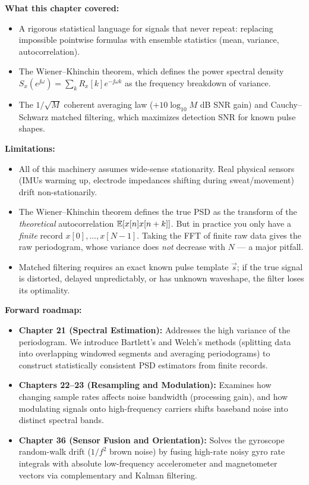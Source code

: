 \begin{recoverybox}
\textbf{What this chapter covered:}
\begin{itemize}
  \item A rigorous statistical language for signals that never repeat: replacing impossible pointwise formulas with ensemble statistics (mean, variance, autocorrelation).
  \item The Wiener--Khinchin theorem, which defines the power spectral density $S_x(e^{\jj\omega}) = \sum_k R_x[k]e^{-\jj\omega k}$ as the frequency breakdown of variance.
  \item The $1/\sqrt{M}$ coherent averaging law ($+10\log_{10}M$ dB SNR gain) and Cauchy--Schwarz matched filtering, which maximizes detection SNR for known pulse shapes.
\end{itemize}

\textbf{Limitations:}
\begin{itemize}
  \item All of this machinery assumes wide-sense stationarity. Real physical sensors (IMUs warming up, electrode impedances shifting during sweat/movement) drift non-stationarily.
  \item The Wiener--Khinchin theorem defines the true PSD as the transform of the \emph{theoretical} autocorrelation $\operatorname{\mathbb{E}}[x[n]x[n+k]]$. But in practice you only have a \emph{finite} record $x[0], \dots, x[N-1]$. Taking the FFT of finite raw data gives the raw periodogram, whose variance does \emph{not} decrease with $N$ --- a major pitfall.
  \item Matched filtering requires an exact known pulse template $\vec{s}$; if the true signal is distorted, delayed unpredictably, or has unknown waveshape, the filter loses its optimality.
\end{itemize}

\textbf{Forward roadmap:}
\begin{itemize}
  \item \textbf{Chapter 21 (Spectral Estimation):} Addresses the high variance of the periodogram. We introduce Bartlett's and Welch's methods (splitting data into overlapping windowed segments and averaging periodograms) to construct statistically consistent PSD estimators from finite records.
  \item \textbf{Chapters 22--23 (Resampling and Modulation):} Examines how changing sample rates affects noise bandwidth (processing gain), and how modulating signals onto high-frequency carriers shifts baseband noise into distinct spectral bands.
  \item \textbf{Chapter 36 (Sensor Fusion and Orientation):} Solves the gyroscope random-walk drift ($1/f^2$ brown noise) by fusing high-rate noisy gyro rate integrals with absolute low-frequency accelerometer and magnetometer vectors via complementary and Kalman filtering.
\end{itemize}
\end{recoverybox}

